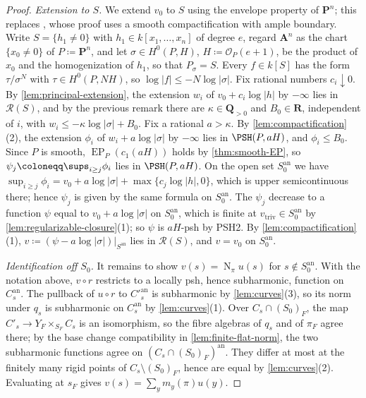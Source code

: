 \documentclass[11pt,a4paper]{article}
\newcommand{\an}{\mathrm{an}}          %
\newcommand{\vtriv}{v_{\mathrm{triv}}} %
\newcommand{\EP}{\operatorname{EP}}
\newcommand{\Norm}{\operatorname{N}}
\begin{document}
\begin{proof}
\emph{Extension to $S$.} We extend $v_0$ to $S$ using the envelope property of $\mathbf P^n$; this replaces \cite[Theorem~3.31]{Wu26}, whose proof uses a smooth compactification with ample boundary. Write $S=\{h_1\ne0\}$ with $h_1\in k[x_1,\ldots,x_n]$ of degree $e$, regard $\mathbf A^n$ as the chart $\{x_0\ne0\}$ of $P\coloneqq\mathbf P^n$, and let $\sigma\in H^0(P,H)$, $H\coloneqq\mathcal O_P(e+1)$, be the product of $x_0$ and the homogenization of $h_1$, so that $P_\sigma=S$. Every $f\in k[S]$ has the form $\tau/\sigma^N$ with $\tau\in H^0(P,NH)$, so $\log|f|\le-N\log|\sigma|$. Fix rational numbers $c_i\downarrow0$. By \cref{lem:principal-extension}, the extension $w_i$ of $v_0+c_i\log|h|$ by $-\infty$ lies in $\mathcal{R}(S)$, and by the previous remark there are $\kappa\in\mathbf Q_{>0}$ and $B_0\in\mathbf R$, independent of $i$, with $w_i\le-\kappa\log|\sigma|+B_0$. Fix a rational $a>\kappa$. By \cref{lem:compactification}(2), the extension $\phi_i$ of $w_i+a\log|\sigma|$ by $-\infty$ lies in $\PSH(P,aH)$, and $\phi_i\le B_0$. Since $P$ is smooth, $\EP_P(c_1(aH))$ holds by \cref{thm:smooth-EP}, so $\psi_j\coloneqq\sups_{i\ge j}\phi_i$ lies in $\PSH(P,aH)$. On the open set $S_0^{\an}$ we have $\sup_{i\ge j}\phi_i=v_0+a\log|\sigma|+\max\{c_j\log|h|,0\}$, which is upper semicontinuous there; hence $\psi_j$ is given by the same formula on $S_0^{\an}$. The $\psi_j$ decrease to a function $\psi$ equal to $v_0+a\log|\sigma|$ on $S_0^{\an}$, which is finite at $\vtriv\in S_0^{\an}$ by \cref{lem:regularizable-closure}(1); so $\psi$ is $aH$-psh by PSH2. By \cref{lem:compactification}(1), $v\coloneqq(\psi-a\log|\sigma|)|_{S^{\an}}$ lies in $\mathcal{R}(S)$, and $v=v_0$ on $S_0^{\an}$.

\emph{Identification off $S_0$.} It remains to show $v(s)=\Norm_\pi u(s)$ for $s\notin S_0^{\an}$. With the notation above, $v\circ r$ restricts to a locally psh, hence subharmonic, function on $C_s^{\an}$. The pullback of $u\circ r$ to $C'^{\an}_s$ is subharmonic by \cref{lem:curves}(3), so its norm under $q_s$ is subharmonic on $C_s^{\an}$ by \cref{lem:curves}(1). Over $C_s\cap(S_0)_F$, the map $C'_s\to Y_F\times_{S_F}C_s$ is an isomorphism, so the fibre algebras of $q_s$ and of $\pi_F$ agree there; by the base change compatibility in \cref{lem:finite-flat-norm}, the two subharmonic functions agree on $(C_s\cap(S_0)_F)^{\an}$. They differ at most at the finitely many rigid points of $C_s\setminus(S_0)_F$, hence are equal by \cref{lem:curves}(2). Evaluating at $s_F$ gives $v(s)=\sum_ym_y(\pi)u(y)$.
\end{proof}
\end{document}
